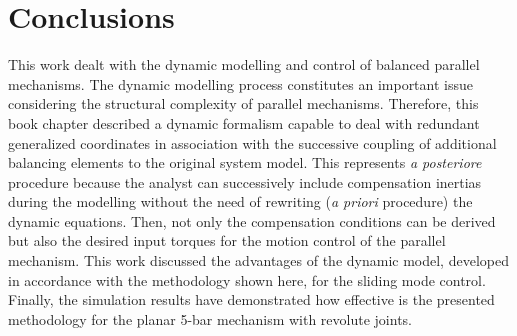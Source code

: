 \section{Conclusions}\label{S05}

%
%

This work dealt with the dynamic modelling and control of balanced parallel
mechanisms. The dynamic modelling process constitutes an important issue considering
the structural complexity of parallel mechanisms. 
Therefore, this book chapter described a dynamic formalism capable to deal with
redundant generalized coordinates in association with the successive coupling of additional balancing elements 
to the original system model. 
This represents {\em a posteriore} procedure because the analyst can 
successively include compensation inertias  
during the modelling
without the need of rewriting ({\em a priori} procedure) the dynamic equations.
Then, not only the compensation conditions can be derived 
but also the desired input torques for the motion control of the parallel mechanism.
This work discussed the advantages of the dynamic model,
developed in accordance with the methodology shown here, for the
sliding mode control. Finally, the simulation results have demonstrated
how effective is the presented methodology for the planar 5-bar mechanism with revolute joints. 